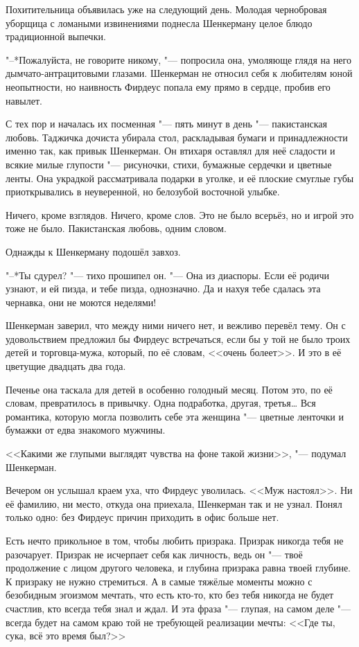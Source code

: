Похитительница объявилась уже на следующий день.
Молодая чернобровая уборщица с ломаными извинениями поднесла Шенкерману целое блюдо традиционной выпечки.

"--*Пожалуйста, не говорите никому, "--- попросила она, умоляюще глядя на него дымчато-антрацитовыми глазами.
Шенкерман не относил себя к любителям юной неопытности, но наивность Фирдеус попала ему прямо в сердце, пробив его навылет.

С тех пор и началась их посменная "--- пять минут в день "--- пакистанская любовь.
Таджичка дочиста убирала стол, раскладывая бумаги и принадлежности именно так, как привык Шенкерман.
Он втихаря оставлял для неё сладости и всякие милые глупости "--- рисуночки, стихи, бумажные сердечки и цветные ленты.
Она украдкой рассматривала подарки в уголке, и её плоские смуглые губы приоткрывались в неуверенной, но белозубой восточной улыбке.

Ничего, кроме взглядов.
Ничего, кроме слов.
Это не было всерьёз, но и игрой это тоже не было.
Пакистанская любовь, одним словом.

Однажды к Шенкерману подошёл завхоз.

"--*Ты сдурел? "--- тихо прошипел он.
"--- Она из диаспоры.
Если её родичи узнают, и ей пизда, и тебе пизда, однозначно.
Да и нахуя тебе сдалась эта чернавка, они не моются неделями!

Шенкерман заверил, что между ними ничего нет, и вежливо перевёл тему.
Он с удовольствием предложил бы Фирдеус встречаться, если бы у той не было троих детей и торговца-мужа, который, по её словам, <<очень болеет>>.
И это в её цветущие двадцать два года.

Печенье она таскала для детей в особенно голодный месяц.
Потом это, по её словам, превратилось в привычку.
Одна подработка, другая, третья\dots{}
Вся романтика, которую могла позволить себе эта женщина "--- цветные ленточки и бумажки от едва знакомого мужчины.

<<Какими же глупыми выглядят чувства на фоне такой жизни>>, "--- подумал Шенкерман.

Вечером он услышал краем уха, что Фирдеус уволилась.
<<Муж настоял>>.
Ни её фамилию, ни место, откуда она приехала, Шенкерман так и не узнал.
Понял только одно: без Фирдеус причин приходить в офис больше нет.

\asterism

Есть нечто прикольное в том, чтобы любить призрака.
Призрак никогда тебя не разочарует.
Призрак не исчерпает себя как личность, ведь он "--- твоё продолжение с лицом другого человека, и глубина призрака равна твоей глубине.
К призраку не нужно стремиться.
А в самые тяжёлые моменты можно с безобидным эгоизмом мечтать, что есть кто-то, кто без тебя никогда не будет счастлив, кто всегда тебя знал и ждал.
И эта фраза "--- глупая, на самом деле "--- всегда будет на самом краю той не требующей реализации мечты:
<<Где ты, сука, всё это время был?>>

